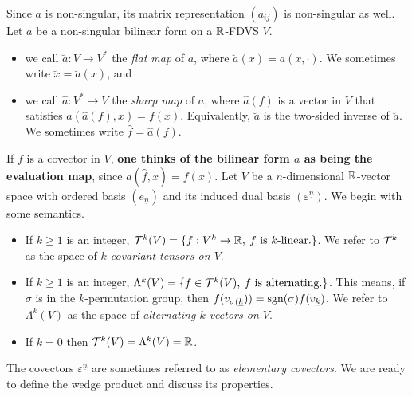 \documentclass[../main-v2-manifolds.tex]{subfiles}
\begin{document}
Since $a$ is non-singular, its matrix representation $(a_{ij})$ is non-singular as well. \\
%
%
%
Let $a$ be a non-singular bilinear form on a $\mathbb{R}$-FDVS $V$.
\begin{itemize}
    \item we call $\breve{a}: V\to V^*$ the \emph{flat map} of $a$, where $\breve{a}(x) = a(x,\cdot)$. We sometimes write $\breve{x} = \breve{a}(x)$, and 
    \item we call $\hat{a}: V^*\to V$ the \emph{sharp map} of $a$, where $\hat{a}(f)$ is a vector in $V$ that satisfies $a(\hat{a}(f), x) = f(x)$. Equivalently, $\breve{a}$ is the two-sided inverse of $\breve{a}$. We sometimes write $\hat{f} = \hat{a}(f)$.
\end{itemize}
If $f$ is a covector in $V$, \textbf{one thinks of the bilinear form $a$ as being the evaluation map}, since $a(\hat{f},x) = f(x)$.
Let $V$ be a $n$-dimensional $\mathbb{R}$-vector space with ordered basis $(e_{\underline{n}})$ and its induced dual basis $(\varepsilon^{\underline{n}})$. We begin with some semantics.
\begin{itemize}
    \item If $k\geq 1$ is an integer, $\mathcal{T}^k(V) = \{f: V^k\to\mathbb{R},\: f\text{ is }k\text{-linear.}\}$. We refer to $\mathcal{T}^k$ as the space of \emph{$k$-covariant tensors on $V$}.
    \item If $k\geq 1$ is an integer, $\Lambda^k(V) = \{f\in \mathcal{T}^k(V),\: f\text{ is alternating.}\}$. This means, if $\sigma$ is in the $k$-permutation group, then $f(v_{\sigma(\underline{k}})) = \operatorname{sgn}(\sigma)f(v_{\underline{k}})$. We refer to $\Lambda^k(V)$ as the space of \emph{alternating $k$-vectors on $V$}.
    \item If $k=0$ then $\mathcal{T}^k(V) = \Lambda^k(V) =\mathbb{R}$.
\end{itemize}
The covectors $\varepsilon^{\underline{n}}$ are sometimes referred to as \emph{elementary covectors}. We are ready to define the wedge product and discuss its properties.
\end{document}
